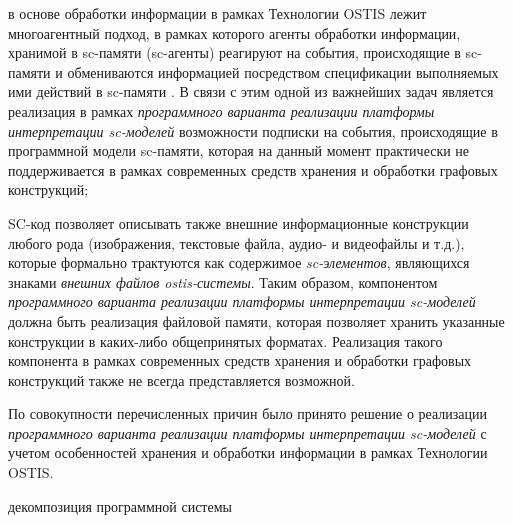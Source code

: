 \begin{SCn}
\begin{scnsubstruct}
{\begin{scnitemize}
                \item в основе обработки информации в рамках Технологии OSTIS лежит многоагентный подход, в рамках которого агенты обработки информации, хранимой в sc-памяти (sc-агенты) реагируют на события, происходящие в sc-памяти и обмениваются информацией посредством спецификации выполняемых ими действий в sc-памяти \cite{Shunkevich2018}. В связи с этим одной из важнейших задач является реализация в рамках \textit{программного варианта реализации платформы интерпретации sc-моделей} возможности подписки на события, происходящие в программной модели sc-памяти, которая на данный момент практически не поддерживается в рамках современных средств хранения и обработки графовых конструкций;
                \item SC-код позволяет описывать также внешние информационные конструкции любого рода (изображения, текстовые файла, аудио- и видеофайлы и т.д.), которые формально трактуются как содержимое \textit{sc-элементов}, являющихся знаками \textit{внешних файлов ostis-системы}. Таким образом, компонентом \textit{программного варианта реализации платформы интерпретации sc-моделей} должна быть реализация файловой памяти, которая позволяет хранить указанные конструкции в каких-либо общепринятых форматах. Реализация такого компонента в рамках современных средств хранения и обработки графовых конструкций также не всегда представляется возможной.
            \end{scnitemize}
            По совокупности перечисленных причин было принято решение о реализации \textit{программного варианта реализации платформы интерпретации sc-моделей}  с учетом особенностей хранения и обработки информации в рамках Технологии OSTIS.}
        \begin{scnrelfromset}{декомпозиция программной системы}
        \end{scnrelfromset}

\end{scnsubstruct}
\end{SCn}
